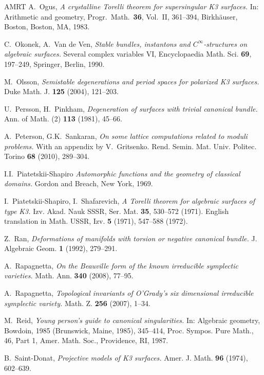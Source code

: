 \documentclass[a4paper,11pt]{article}
\begin{document}
\begin{thebibliography}{AMRT}
 A.~Ogus, {\it A crystalline Torelli theorem for
  supersingular K3 surfaces.}  In: Arithmetic and geometry,
  Progr.~Math.~{\bf 36}, Vol.~II, 361--394, Birkh\"auser, Boston,
  Boston, MA, 1983.

 C.~Okonek, A.~Van de Ven, {\it Stable bundles,
  instantons and $C^\infty$-structures on algebraic surfaces.} Several
complex variables VI, Encyclopaedia Math. Sci. {\bf 69}, 197--249,
Springer, Berlin, 1990.

 M.~Olsson, {\it Semistable degenerations and period
  spaces for polarized K3 surfaces.}  Duke Math. J. {\bf 125} (2004),
  121--203.

 U.~Persson, H.~Pinkham, {\it Degeneration of surfaces
  with trivial canonical bundle.}  Ann. of Math. (2) {\bf 113} (1981),
  45--66.

 A.~Peterson, G.K.~Sankaran, {\it On some lattice
  computations related to moduli problems.} With an appendix by
  V.~Gritsenko. Rend. Semin. Mat. Univ. Politec. Torino {\bf 68}
  (2010), 289--304.

 I.I.~Piatetskii-Shapiro {\it Automorphic functions
  and the geometry of classical domains.}  Gordon and Breach, New
  York, 1969.

 I.~Piatetskii-Shapiro, I.~Shafarevich, {\it A
  Torelli theorem for algebraic surfaces of type K3.}  Izv.
  Akad. Nauk SSSR, Ser. Mat. {\bf 35}, 530--572 (1971).  English
  translation in Math. USSR, Izv. {\bf 5} (1971), 547--588 (1972).

 Z.~Ran, {\it Deformations of manifolds with torsion
  or negative canonical bundle.}  J. Algebraic Geom. {\bf 1} (1992),
  279--291.

 A.~Rapagnetta, {\it On the Beauville form of the
  known irreducible symplectic varieties.}  Math. Ann.  {\bf 340}
  (2008), 77--95.

 A.~Rapagnetta, {\it Topological invariants of
  O'Grady's six dimensional irreducible symplectic variety.}
  Math. Z. {\bf 256} (2007), 1--34.
 
 M.~Reid, {\it Young person's guide to canonical
  singularities.} In: Algebraic geometry, Bowdoin, 1985 (Brunswick, Maine,
  1985), 345--414, Proc. Sympos. Pure Math., 46, Part 1,
  Amer. Math. Soc., Providence, RI, 1987.

 B.~Saint-Donat, {\it Projective models of K3
  surfaces.}  Amer. J. Math.  {\bf 96} (1974), 602--639.


\end{thebibliography}
\end{document}
